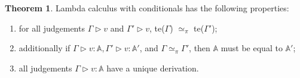 \documentclass[10pt,a4paper]{amsart}
\theoremstyle{definition}
\theoremstyle{definition}
\theoremstyle{definition}
\theoremstyle{definition}
\theoremstyle{definition}
\theoremstyle{definition}
\newtheorem{theorem}[definition]{Theorem}
\begin{document}


\begin{theorem} \label {theorem:unique_der}
    Lambda calculus with conditionals has the following properties:
   \begin{enumerate}
     \item for all judgements $\Gamma \triangleright v$ and $\Gamma' \triangleright v$, te($\Gamma$) $\simeq_{\pi}$  te($\Gamma'$); 
     \item additionally if $\Gamma \triangleright v: \mathbb{A}, \Gamma'\triangleright v: \mathbb{A}'$, and $\Gamma \simeq_{\pi} \Gamma' $, then $\mathbb{A}$ must be equal to $\mathbb{A}'$;
     \item all judgements $\Gamma \triangleright v:\mathbb{A}$ have a unique derivation.
   \end{enumerate}
   \end{theorem}
\end{document}
